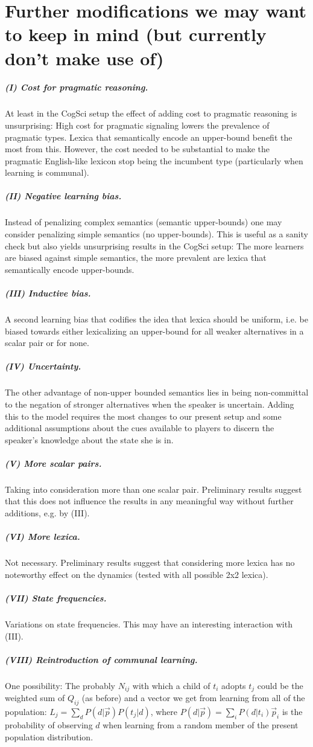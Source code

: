 \documentclass[11pt]{article}
\begin{document}
\section{Further modifications we may want to keep in mind (but currently don't make use of)}
\subparagraph{(I) Cost for pragmatic reasoning.} At least in the CogSci setup the effect of adding cost to pragmatic reasoning is unsurprising: High cost for pragmatic signaling lowers the prevalence of pragmatic types. Lexica that semantically encode an upper-bound benefit the most from this. However, the cost needed to be substantial to make the pragmatic English-like lexicon stop being the incumbent type (particularly when learning is communal). 

\subparagraph{(II) Negative learning bias.} Instead of penalizing complex semantics (semantic upper-bounds) one may consider penalizing simple semantics (no upper-bounds). This is useful as a sanity check but also yields unsurprising results in the CogSci setup: The more learners are biased against simple semantics, the more prevalent are lexica that semantically encode upper-bounds. 

\subparagraph{(III) Inductive bias.} A second learning bias that codifies the idea that lexica should be uniform, i.e. be biased towards either lexicalizing an upper-bound for all weaker alternatives in a scalar pair or for none.

\subparagraph{(IV)  Uncertainty.} The other advantage of non-upper bounded semantics lies in being non-committal to the negation of stronger alternatives when the speaker is uncertain. Adding this to the model requires the most changes to our present setup and some additional assumptions about the cues available to players to discern the speaker's knowledge about the state she is in. 

\subparagraph{(V) More scalar pairs.} Taking into consideration more than one scalar pair. Preliminary results suggest that this does not influence the results in any meaningful way without further additions, e.g. by (III).

\subparagraph{(VI) More lexica.} Not necessary. Preliminary results suggest that considering more lexica has no noteworthy effect on the dynamics (tested with all possible 2x2 lexica).

\subparagraph{(VII) State frequencies.} Variations on state frequencies. This may have an interesting interaction with (III).

\subparagraph{(VIII) Reintroduction of communal learning.} One possibility: The probably $N_{ij}$ with which a child of $t_i$ adopts $t_j$ could be the weighted sum of $Q_{ij}$ (as before) and a vector we get from learning from all of the population: $L_j = \sum_d P(d | \vec{p})  P(t_j | d)$, where $P(d | \vec{p}) = \sum_{i} P(d | t_i)  \vec{p}_i$ is the probability of observing $d$ when learning from a random member of the present population distribution.
\end{document}
